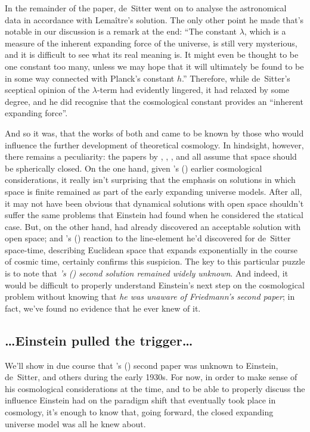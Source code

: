 \documentclass[12 pt]{article}
\def\citeapos#1{\citeauthor{#1}'s (\citeyear{#1})}
\begin{document}
In the remainder of the paper, de~Sitter went on to analyse the astronomical data in accordance with Lema\^{i}tre's solution. The only other point he made that's notable in our discussion is a remark at the end: ``The constant $\lambda$, which is a measure of the inherent expanding force of the universe, is still very mysterious, and it is difficult to see what its real meaning is. It might even be thought to be one constant too many, unless we may hope that it will ultimately be found to be in some way connected with Planck's constant $h$.'' Therefore, while de~Sitter's sceptical opinion of the $\lambda$-term had evidently lingered, it had relaxed by some degree, and he did recognise that the cosmological constant provides an ``inherent expanding force''.

And so it was, that the works of both \citet{Friedmann1922} and \citet{Lemaitre1927} came to be known by those who would influence the further development of theoretical cosmology. In hindsight, however, there remains a peculiarity: the papers by \citet{Friedmann1922}, \citet{Lemaitre1927}, \citet{Eddington1930}, and \citet{deSitter1930} all assume that space should be spherically closed. On the one hand, given \citeapos{Einstein1917} earlier cosmological considerations, it really isn't surprising that the emphasis on solutions in which space is finite remained as part of the early expanding universe models. After all, it may not have been obvious that dynamical solutions with open space shouldn't suffer the same problems that Einstein had found when he considered the statical case. But, on the other hand, \citet{Friedmann1924} had already discovered an acceptable solution with open space; and \citeapos{Lemaitre1925} reaction to the line-element he'd discovered for de~Sitter space-time, describing Euclidean space that expands exponentially in the course of cosmic time, certainly confirms this suspicion. The key to this particular puzzle is to note that \textit{\citeapos{Friedmann1924} second solution remained widely unknown}. And indeed, it would be difficult to properly understand Einstein's next step on the cosmological problem without knowing that \textit{he was unaware of Friedmann's second paper}; in fact, we've found no evidence that he ever knew of it.

\subsection{\ldots Einstein pulled the trigger\ldots}
\label{sec:4.2}
We'll show in due course that \citeapos{Friedmann1924} second paper was unknown to Einstein, de~Sitter, and others during the early 1930s. For now, in order to make sense of his cosmological considerations at the time, and to be able to properly discuss the influence Einstein had on the paradigm shift that eventually took place in cosmology, it's enough to know that, going forward, the closed expanding universe model was all he knew about. 
\end{document}
